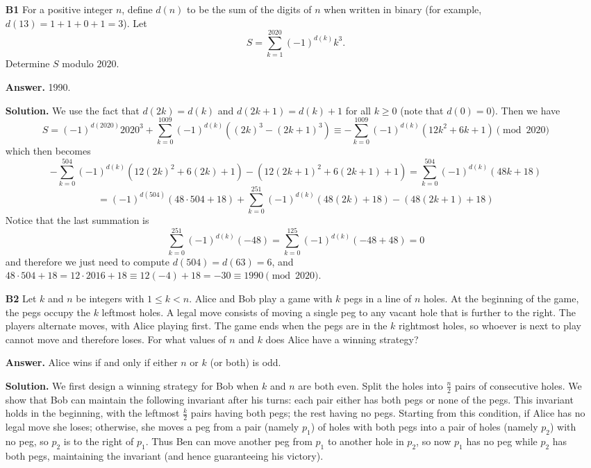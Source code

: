 \documentclass[11pt,a4paper]{article}
\newcommand{\<}{\langle}
\renewcommand{\>}{\rangle}
\begin{document}
\begin{enumerate}
    \item [\textbf{B1}] 
    For a positive integer $n$, define $d(n)$ to be the sum of the digits of $n$ when written in binary (for example, $d(13)=1+1+0+1=3$). Let
    \[
    S=\sum_{k=1}^{2020}(-1)^{d(k)}k^3.
    \]Determine $S$ modulo $2020$.
    
    \textbf{Answer.} 1990. 
    
    \textbf{Solution.} 
    We use the fact that $d(2k) = d(k) $ and $d(2k + 1) = d(k) + 1$ for all $k\ge 0$ (note that $d(0)=0$). 
    Then we have 
    \[
    S
    =(-1)^{d(2020)}2020^3 + \sum_{k=0}^{1009}(-1)^{d(k)}((2k)^3 - (2k+1)^3)
    \equiv -\sum_{k=0}^{1009}(-1)^{d(k)}(12k^2 + 6k + 1)
    \pmod{2020}
    \]
    which then becomes 
    \[
     -\sum_{k=0}^{504}(-1)^{d(k)}(12(2k)^2 + 6(2k) + 1) - (12(2k + 1)^2 + 6(2k + 1) + 1)
     =\sum_{k=0}^{504}(-1)^{d(k)} (48k+18)
    \]
    \[
    =(-1)^{d(504)} (48\cdot 504+18)
    +\sum_{k=0}^{251}(-1)^{d(k)} (48(2k) + 18) - (48(2k + 1) + 18)
    \]
    Notice that the last summation is 
    \[
    \sum_{k=0}^{251}(-1)^{d(k)} (-48)
    =\sum_{k=0}^{125}(-1)^{d(k)} (-48+48)
    =0
    \]
    and therefore we just need to compute $d(504)=d(63)=6$, 
    and $48\cdot 504+18=12\cdot 2016 + 18\equiv 12(-4)+18=-30\equiv 1990\pmod{2020}$. 
    
    \item [\textbf{B2}]
    Let $k$ and $n$ be integers with $1\leq k<n$. Alice and Bob play a game with $k$ pegs in a line of $n$ holes. At the beginning of the game, the pegs occupy the $k$ leftmost holes. A legal move consists of moving a single peg to any vacant hole that is further to the right. The players alternate moves, with Alice playing first. The game ends when the pegs are in the $k$ rightmost holes, so whoever is next to play cannot move and therefore loses. For what values of $n$ and $k$ does Alice have a winning strategy?
    
    \textbf{Answer.} Alice wins if and only if either $n$ or $k$ (or both) is odd. 
    
    \textbf{Solution.} 
    We first design a winning strategy for Bob when $k$ and $n$ are both even. 
    Split the holes into $\frac{n}{2}$ pairs of consecutive holes. 
    We show that Bob can maintain the following invariant after his turns: 
    each pair either has both pegs or none of the pegs. 
    This invariant holds in the beginning, with the leftmost $\frac{k}{2}$ pairs having both pegs; 
    the rest having no pegs. 
    Starting from this condition, if Alice has no legal move she loses; 
    otherwise, she moves a peg from a pair (namely $p_1$) of holes with both pegs into a pair of holes (namely $p_2$) with no peg, 
    so $p_2$ is to the right of $p_1$. 
    Thus Ben can move another peg from $p_1$ to another hole in $p_2$, 
    so now $p_1$ has no peg while $p_2$ has both pegs, 
    maintaining the invariant (and hence guaranteeing his victory). 
    

\end{enumerate}
\end{document}
